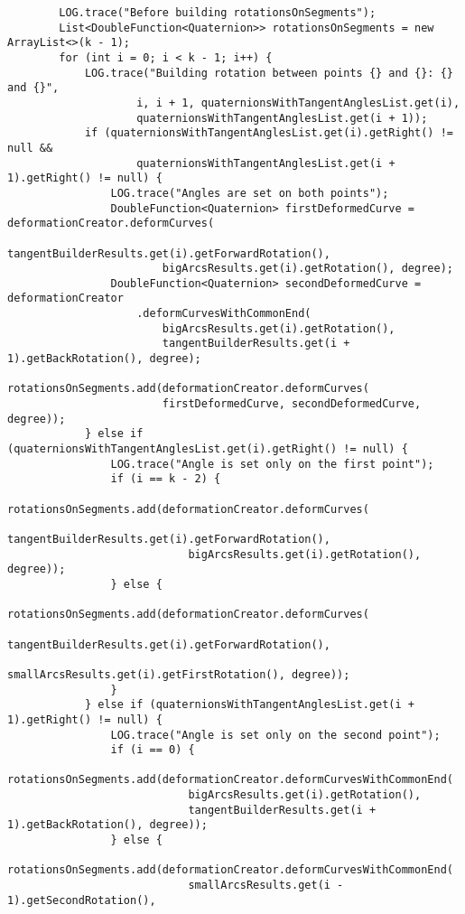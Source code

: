 \begin{verbatim}
        LOG.trace("Before building rotationsOnSegments");
        List<DoubleFunction<Quaternion>> rotationsOnSegments = new ArrayList<>(k - 1);
        for (int i = 0; i < k - 1; i++) {
            LOG.trace("Building rotation between points {} and {}: {} and {}",
                    i, i + 1, quaternionsWithTangentAnglesList.get(i),
                    quaternionsWithTangentAnglesList.get(i + 1));
            if (quaternionsWithTangentAnglesList.get(i).getRight() != null &&
                    quaternionsWithTangentAnglesList.get(i + 1).getRight() != null) {
                LOG.trace("Angles are set on both points");
                DoubleFunction<Quaternion> firstDeformedCurve = deformationCreator.deformCurves(
                        tangentBuilderResults.get(i).getForwardRotation(),
                        bigArcsResults.get(i).getRotation(), degree);
                DoubleFunction<Quaternion> secondDeformedCurve = deformationCreator
                    .deformCurvesWithCommonEnd(
                        bigArcsResults.get(i).getRotation(),
                        tangentBuilderResults.get(i + 1).getBackRotation(), degree);
                rotationsOnSegments.add(deformationCreator.deformCurves(
                        firstDeformedCurve, secondDeformedCurve, degree));
            } else if (quaternionsWithTangentAnglesList.get(i).getRight() != null) {
                LOG.trace("Angle is set only on the first point");
                if (i == k - 2) {
                    rotationsOnSegments.add(deformationCreator.deformCurves(
                            tangentBuilderResults.get(i).getForwardRotation(),
                            bigArcsResults.get(i).getRotation(), degree));
                } else {
                    rotationsOnSegments.add(deformationCreator.deformCurves(
                            tangentBuilderResults.get(i).getForwardRotation(),
                            smallArcsResults.get(i).getFirstRotation(), degree));
                }
            } else if (quaternionsWithTangentAnglesList.get(i + 1).getRight() != null) {
                LOG.trace("Angle is set only on the second point");
                if (i == 0) {
                    rotationsOnSegments.add(deformationCreator.deformCurvesWithCommonEnd(
                            bigArcsResults.get(i).getRotation(),
                            tangentBuilderResults.get(i + 1).getBackRotation(), degree));
                } else {
                    rotationsOnSegments.add(deformationCreator.deformCurvesWithCommonEnd(
                            smallArcsResults.get(i - 1).getSecondRotation(),

\end{verbatim}
